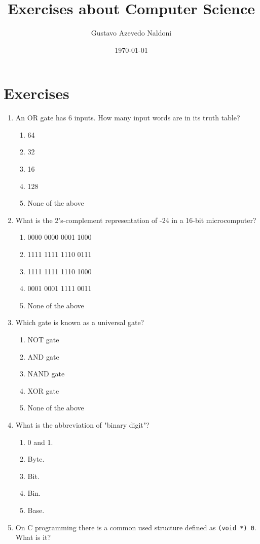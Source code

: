 \documentclass{article}
\title{Exercises about Computer Science}
\author{Gustavo Azevedo Naldoni}
\date{\today}
\begin{document}

\maketitle
\section{Exercises}
\begin{enumerate}
\item An OR gate has 6 inputs. How many input words are in its truth table?
    
            \begin{enumerate}
                \item 64
                \item 32
                \item 16
                \item 128
                \item None of the above
            \end{enumerate}
\item What is the 2's-complement representation of -24 in a 16-bit microcomputer?
    
            \begin{enumerate}
                \item 0000 0000 0001 1000
                \item 1111 1111 1110 0111
                \item 1111 1111 1110 1000
                \item 0001 0001 1111 0011
                \item None of the above
            \end{enumerate}
\item Which gate is known as a universal gate?
    
            \begin{enumerate}
                \item NOT gate
                \item AND gate
                \item NAND gate
                \item XOR gate
                \item None of the above
            \end{enumerate}
\item What is the abbreviation of "binary digit"?
    
            \begin{enumerate}
                \item 0 and 1.
                \item Byte.
                \item Bit.
                \item Bin.
                \item Base.
            \end{enumerate}
\item On C programming there is a common used structure defined as \texttt{(void *) 0}. What is it?
    

\end{enumerate}
\end{document}
